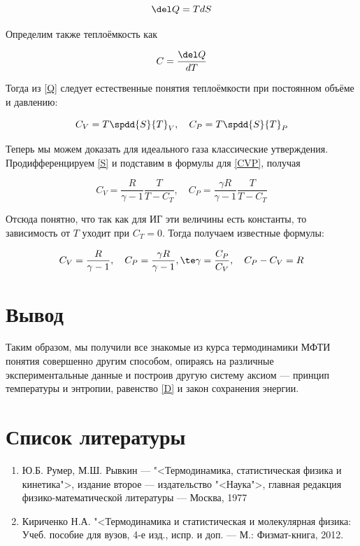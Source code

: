 \documentclass[12pt]{kiarticle}
\begin{document}
\begin{equation}\label{Q}
\del Q = TdS
\end{equation}

Определим также теплоёмкость как 

\begin{equation}\label{}
C = \dfrac{\del Q}{dT}
\end{equation}

Тогда из \eqref{Q} следует естественные понятия теплоёмкости при постоянном объёме и давлению:

\begin{equation} \label{CVP}
C_V = T \spdd{S}{T}_V, \quad C_P = T \spdd{S}{T}_P
\end{equation} 

Теперь мы можем доказать для идеального газа классические утверждения. Продифференцируем \eqref{S} и подставим в формулы для \eqref{CVP}, получая

\begin{equation}\label{}
C_V = \dfrac{R}{\gamma - 1} \dfrac{T}{T - C_T}, \quad C_P = \dfrac{\gamma R}{\gamma - 1} \dfrac{T}{T - C_T} 
\end{equation}

Отсюда понятно, что так как для ИГ эти величины есть константы, то зависимость от $ T $ уходит при $ C_T = 0 $. Тогда получаем известные формулы:

\begin{equation}\label{}
C_V = \dfrac{R}{\gamma - 1},  \quad C_P = \dfrac{\gamma R}{\gamma - 1}, \te \gamma = \dfrac{C_P}{C_V}, \quad C_P - C_V = R
\end{equation}


\section{Вывод}

Таким образом, мы получили все знакомые из курса термодинамики МФТИ понятия совершенно другим способом, опираясь на различные экспериментальные данные и построив другую систему аксиом --- принцип температуры и энтропии, равенство \eqref{D} и  закон сохранения энергии.






\section*{Список литературы}

\begin{enumerate}
	
	\item Ю.Б. Румер, М.Ш. Рывкин --- "<Термодинамика, статистическая физика и кинетика">, издание второе ---  издательство "<Наука">, главная редакция физико-математической литературы --- Москва, 1977 
	
	\item Кириченко Н.А. "<Термодинамика и статистическая и молекулярная физика: Учеб. пособие для вузов, 4-е изд., испр. и доп. --- М.: Физмат-книга, 2012. 
	
\end{enumerate}
\end{document}
